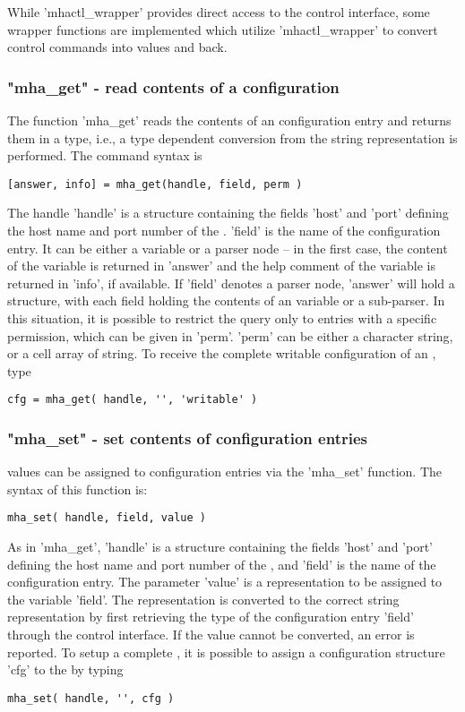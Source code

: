 While 'mhactl\_wrapper' provides direct access to the \mha{} control interface,
some wrapper functions are implemented which utilize 'mhactl\_wrapper' to
convert \mha{} control commands into \Matlab{} values and back.

\subsubsection{"mha\_get" - read contents of a \mha configuration}

The function 'mha\_get' reads the contents of an \mha{} configuration
entry and returns them in a \Matlab{} type, i.e., a type dependent
conversion from the \mha{} string representation is performed. The
command syntax is
\begin{verbatim}[answer, info] = mha_get(handle, field, perm )\end{verbatim}
The \mha{} handle 'handle' is a structure containing the fields 'host'
and 'port' defining the host name and port number of the \mhad{}.
%
'field' is the name of the \mha{} configuration entry.
%
It can be either a variable or a parser node -- in the first case, the
content of the variable is returned in 'answer' and the help comment
of the variable is returned in 'info', if available.
%
If 'field' denotes a parser node, 'answer' will hold a \Matlab{}
structure, with each field holding the contents of an \mha{} variable or a
sub-parser.
%
In this situation, it is possible to restrict the query only to
entries with a specific permission, which can be given in 'perm'.
%
'perm' can be either a character string, or a cell array of string.
%
To receive the complete writable configuration of an \mhad{}, type
\begin{verbatim}cfg = mha_get( handle, '', 'writable' )\end{verbatim}
%

\subsubsection{"mha\_set" - set contents of \mha{} configuration entries}

\Matlab{} values can be assigned to \mha{} configuration entries via the
'mha\_set' function.
%
The syntax of this function is:
\begin{verbatim}mha_set( handle, field, value )\end{verbatim}
%
As in 'mha\_get', 'handle' is a structure containing the fields 'host'
and 'port' defining the host name and port number of the \mhad{}, and
'field' is the name of the \mha{} configuration entry.
%
The parameter 'value' is a \Matlab{} representation to be assigned to
the variable 'field'.
%
The \Matlab{} representation is converted to the correct \mha{} string
representation by first retrieving the type of the configuration entry
'field' through the control interface.
%
If the \Matlab{} value cannot be converted, an error is reported.
%
To setup a complete \mha{}, it is possible to assign a \Matlab{}
configuration structure 'cfg' to the \mha{} by typing
\begin{verbatim}mha_set( handle, '', cfg )\end{verbatim}

